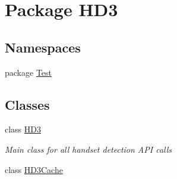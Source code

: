 \hypertarget{namespace_h_d3}{\section{Package H\+D3}
\label{namespace_h_d3}
}
\subsection*{Namespaces}
\begin{DoxyCompactItemize}
\item 
package \hyperlink{namespace_h_d3_1_1_test}{Test}
\end{DoxyCompactItemize}
\subsection*{Classes}
\begin{DoxyCompactItemize}
\item 
class \hyperlink{class_h_d3_1_1_h_d3}{H\+D3}
\begin{DoxyCompactList}\small\item\em Main class for all handset detection A\+P\+I calls \end{DoxyCompactList}\item 
class \hyperlink{class_h_d3_1_1_h_d3_cache}{H\+D3\+Cache}
\end{DoxyCompactItemize}
